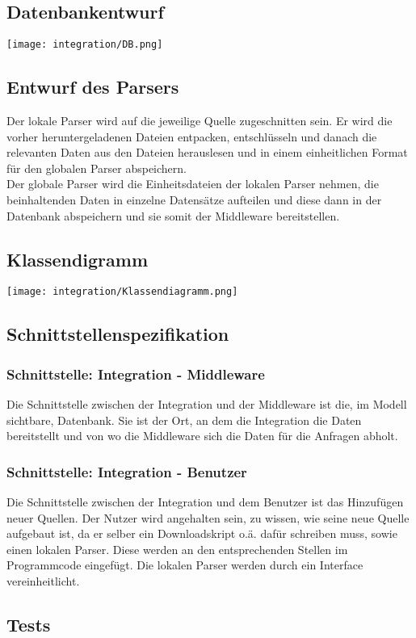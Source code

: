 \documentclass{scrartcl}
\begin{document}
\subsection{Datenbankentwurf}
\texttt{[image: integration/DB.png]}
\subsection{Entwurf des Parsers}
Der lokale Parser wird auf die jeweilige Quelle zugeschnitten sein. Er wird die vorher heruntergeladenen Dateien entpacken, entschlüsseln und danach die relevanten Daten aus den Dateien herauslesen und in einem einheitlichen Format für den globalen Parser abspeichern.\\
Der globale Parser wird die Einheitsdateien der lokalen Parser nehmen, die beinhaltenden Daten in einzelne Datensätze aufteilen und diese dann in der Datenbank abspeichern und sie somit der Middleware bereitstellen.
\subsection{Klassendigramm}
\texttt{[image: integration/Klassendiagramm.png]}
\subsection{Schnittstellenspezifikation}
\subsubsection{Schnittstelle: Integration - Middleware}
Die Schnittstelle zwischen der Integration und der Middleware ist die, im Modell sichtbare, Datenbank. Sie ist der Ort, an dem die Integration die Daten bereitstellt und von wo die Middleware sich die Daten für die Anfragen abholt.
\subsubsection{Schnittstelle: Integration - Benutzer}
Die Schnittstelle zwischen der Integration und dem Benutzer ist das Hinzufügen neuer Quellen. Der Nutzer wird angehalten sein, zu wissen, wie seine neue Quelle aufgebaut ist, da er selber ein Downloadskript o.ä. dafür schreiben muss, sowie einen lokalen Parser. Diese werden an den entsprechenden Stellen im Programmcode eingefügt. Die lokalen Parser werden durch ein Interface vereinheitlicht.
\subsection{Tests}
\end{document}

